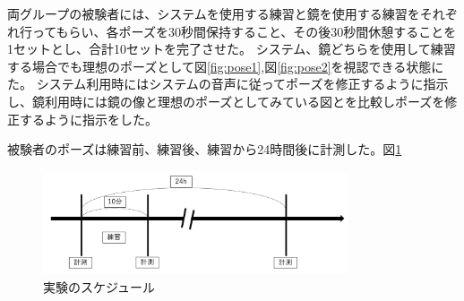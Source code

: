 両グループの被験者には、システムを使用する練習と鏡を使用する練習をそれぞれ行ってもらい、各ポーズを30秒間保持すること、その後30秒間休憩することを1セットとし、合計10セットを完了させた。
システム、鏡どちらを使用して練習する場合でも理想のポーズとして図\ref{fig:pose1},図\ref{fig:pose2}を視認できる状態にた。
システム利用時にはシステムの音声に従ってポーズを修正するように指示し、鏡利用時には鏡の像と理想のポーズとしてみている図とを比較しポーズを修正するように指示をした。

被験者のポーズは練習前、練習後、練習から24時間後に計測した。図\ref{fig:schedule}

\begin{figure}[H]
\begin{center}
\includegraphics[width=9cm]{figures/schedule.png}
\caption{実験のスケジュール}
\label{fig:schedule}
\end{center}
\end{figure}